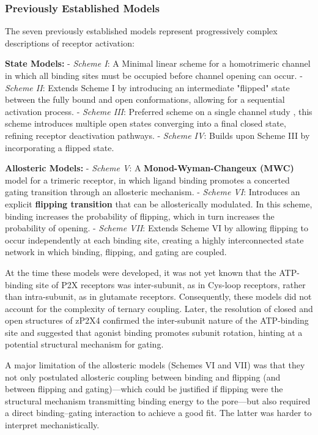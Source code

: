 \documentclass[pdflatex,sn-nature]{sn-jnl}%
\theoremstyle{thmstyleone}%
\theoremstyle{thmstyletwo}%
\theoremstyle{thmstylethree}%
\begin{document}
\subsubsection{Previously Established Models}

The seven previously established models represent progressively complex descriptions of receptor activation:

\textbf{State Models:}  
- \textit{Scheme I}: A Minimal linear scheme for a homotrimeric channel in which all binding sites must be occupied before channel opening can occur.  
- \textit{Scheme II}: Extends Scheme I by introducing an intermediate "flipped" state between the fully bound and open conformations, allowing for a sequential activation process.  
- \textit{Scheme III}: Preferred scheme on a single channel study \cite{properties_single_channe}, this scheme introduces multiple open states converging into a final closed state, refining receptor deactivation pathways.  
- \textit{Scheme IV}: Builds upon Scheme III by incorporating a flipped state.  

\textbf{Allosteric Models:}  
- \textit{Scheme V}: A \textbf{Monod-Wyman-Changeux (MWC)} model for a trimeric receptor, in which ligand binding promotes a concerted gating transition through an allosteric mechanism.  
- \textit{Scheme VI}: Introduces an explicit \textbf{flipping transition} that can be allosterically modulated. In this scheme, binding increases the probability of flipping, which in turn increases the probability of opening.  
- \textit{Scheme VII}: Extends Scheme VI by allowing flipping to occur independently at each binding site, creating a highly interconnected state network in which binding, flipping, and gating are coupled.  

At the time these models were developed, it was not yet known that the ATP-binding site of P2X receptors was inter-subunit, as in Cys-loop receptors, rather than intra-subunit, as in glutamate receptors. Consequently, these models did not account for the complexity of ternary coupling. Later, the resolution of closed and open structures of zP2X4 \cite{cerrada_p2x, abierta_p2x} confirmed the inter-subunit nature of the ATP-binding site and suggested that agonist binding promotes subunit rotation, hinting at a potential structural mechanism for gating.

A major limitation of the allosteric models (Schemes VI and VII) was that they not only postulated allosteric coupling between binding and flipping (and between flipping and gating)—which could be justified if flipping were the structural mechanism transmitting binding energy to the pore—but also required a direct binding–gating interaction to achieve a good fit. The latter was harder to interpret mechanistically. 
\end{document}
